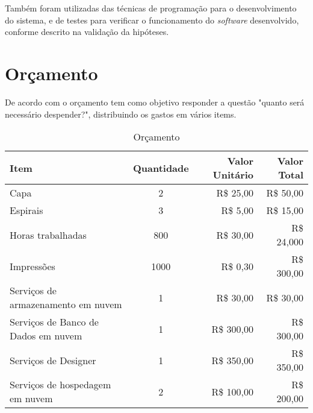 Também foram utilizadas das técnicas de programação para o desenvolvimento
do sistema, e de testes para verificar o funcionamento do \emph{software}
desenvolvido, conforme descrito na validação da hipóteses.

\section{Orçamento} \label{sec:budget}

De acordo com \citep[p. 128]{LAKATOS2021:metodologia} o orçamento
tem como objetivo responder a questão "quanto será necessário
despender?", distribuindo os gastos em vários items.

\begin{table}[H]
    \caption{Orçamento}
    \begin{tabular}{|p{6.4cm}|c|r|r|}
        \hline
        {\textbf{Item}}                         & {\textbf{Quantidade}} & {\textbf{Valor Unitário}} & {\textbf{Valor Total}} \\ \hline
        {{Capa}}                                & {2}                   & {R\$ 25,00 }              & {R\$ 50,00}            \\ \hline
        {{Espirais}}                            & {3}                   & {R\$ 5,00 }               & {R\$ 15,00}            \\ \hline
        {{Horas trabalhadas}}                   & {800}                 & {R\$ 30,00 }              & {R\$ 24,000}           \\ \hline
        {{Impressões}}                          & {1000}                & {R\$ 0,30 }               & {R\$ 300,00}           \\ \hline
        {{Serviços de armazenamento em nuvem}}  & {1}                   & {R\$ 30,00 }              & {R\$ 30,00}            \\ \hline
        {{Serviços de Banco de Dados em nuvem}} & {1}                   & {R\$ 300,00 }             & {R\$ 300,00}           \\ \hline
        {{Serviços de Designer}}                & {1}                   & {R\$ 350,00 }             & {R\$ 350,00}           \\ \hline
        {{Serviços de hospedagem em nuvem}}     & {2}                   & {R\$ 100,00 }             & {R\$ 200,00}           \\ \hline
    \end{tabular}
\end{table}

